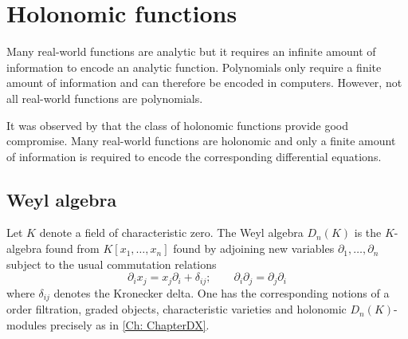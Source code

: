 

\section{Holonomic functions}\label{sec: HolAlgorithm}
Many real-world functions are analytic but it requires an infinite amount of information to encode an analytic function.
Polynomials only require a finite amount of information and can therefore be encoded in computers.
However, not all real-world functions are polynomials.

It was observed by \cite{zeilberger1990holonomic} that the class of holonomic functions provide good compromise.
Many real-world functions are holonomic and only a finite amount of information is required to encode the corresponding differential equations.
\subsection{Weyl algebra}
Let $K$ denote a field of characteristic zero.
The Weyl algebra $D_n(K)$ is the $K$-algebra found from $K[x_1,\ldots,x_n]$ found by adjoining new variables $\partial_1,\ldots,\partial_n$ subject to the usual commutation relations
$$\partial_i x_j = x_j \partial_i + \delta_{ij};\qquad \partial_i \partial_j = \partial_j \partial_i $$
where $\delta_{ij}$ denotes the Kronecker delta.
One has the corresponding notions of a order filtration, graded objects, characteristic varieties and holonomic $D_n(K)$-modules precisely as in \cref{Ch: ChapterDX}.

